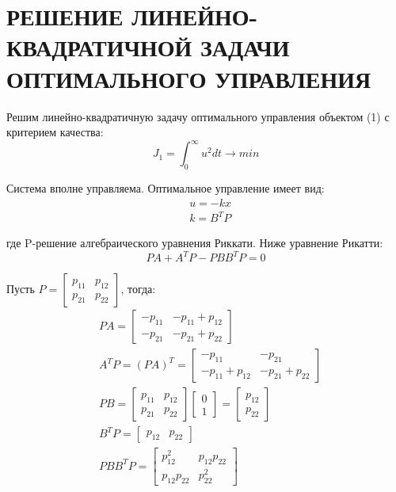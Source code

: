\chapter{\MakeUppercase{Решение линейно-квадратичной задачи оптимального управления}}

Решим линейно-квадратичную задачу оптимального управления объектом (1) с критерием качества:
$$
J_1=\int^{\infty}_0 u^2 dt \rightarrow min
$$

\noindent Система вполне управляема. Оптимальное управление имеет вид:
\begin{align*}
    &u=-kx \\
    &k=B^T P
\end{align*}

\noindent где P-решение алгебраического уравнения Риккати. Ниже уравнение Рикатти:
$$
PA + A^T P - PBB^T P=0
$$

Пусть $ P = \begin{bmatrix} p_{11} & p_{12} \\ p_{21} & p_{22} \end{bmatrix} $, тогда:
\begin{align*}
    &PA = \begin{bmatrix}
        -p_{11} & -p_{11}+p_{12} \\ -p_{21} & -p_{21}+p_{22}
    \end{bmatrix} \\
    & A^T P = (PA)^T = \begin{bmatrix}
        -p_{11} & -p_{21} \\ -p_{11}+p_{12} & -p_{21}+p_{22}
    \end{bmatrix} \\
    &PB = \begin{bmatrix} p_{11} & p_{12} \\ p_{21} & p_{22} \end{bmatrix} \begin{bmatrix} 0 \\ 1 \end{bmatrix} = \begin{bmatrix} p_{12} \\ p_{22} \end{bmatrix} \\
    &B^T P=\begin{bmatrix} p_{12} & p_{22} \end{bmatrix} \\
    &PBB^T P = \begin{bmatrix} p_{12}^2 & p_{12}p_{22} \\ p_{12}p_{22} & p_{22}^2 \end{bmatrix}
\end{align*}


